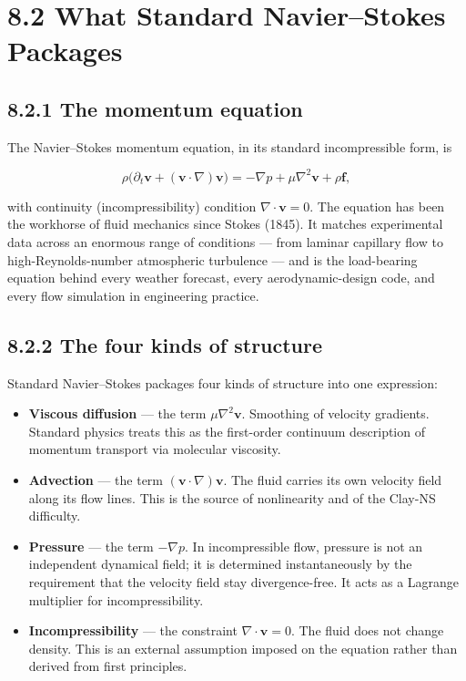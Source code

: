 \documentclass[11pt]{book}
\begin{document}
\section{8.2 What Standard Navier–Stokes Packages}

\subsection{8.2.1 The momentum equation}

The Navier–Stokes momentum equation, in its standard incompressible form, is

\[
\rho\bigl(\partial_t\mathbf{v} + (\mathbf{v}\cdot\nabla)\mathbf{v}\bigr) = -\nabla p + \mu\nabla^2\mathbf{v} + \rho\mathbf{f},
\]

with continuity (incompressibility) condition $\nabla\cdot\mathbf{v} = 0$. The equation has been the workhorse of fluid mechanics since Stokes (1845). It matches experimental data across an enormous range of conditions — from laminar capillary flow to high-Reynolds-number atmospheric turbulence — and is the load-bearing equation behind every weather forecast, every aerodynamic-design code, and every flow simulation in engineering practice.

\subsection{8.2.2 The four kinds of structure}

Standard Navier–Stokes packages four kinds of structure into one expression:

\begin{itemize}
\item \textbf{Viscous diffusion} — the term $\mu\nabla^2\mathbf{v}$. Smoothing of velocity gradients. Standard physics treats this as the first-order continuum description of momentum transport via molecular viscosity.
\item \textbf{Advection} — the term $(\mathbf{v}\cdot\nabla)\mathbf{v}$. The fluid carries its own velocity field along its flow lines. This is the source of nonlinearity and of the Clay-NS difficulty.
\item \textbf{Pressure} — the term $-\nabla p$. In incompressible flow, pressure is not an independent dynamical field; it is determined instantaneously by the requirement that the velocity field stay divergence-free. It acts as a Lagrange multiplier for incompressibility.
\item \textbf{Incompressibility} — the constraint $\nabla\cdot\mathbf{v} = 0$. The fluid does not change density. This is an external assumption imposed on the equation rather than derived from first principles.
\end{itemize}
\end{document}
